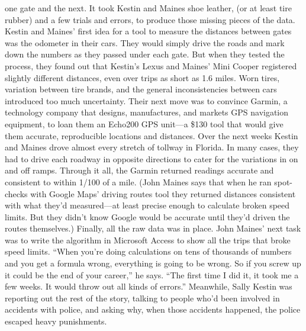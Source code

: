 one gate and the next. It took Kestin and Maines shoe leather, (or at least
tire rubber) and a few trials and errors, to produce those missing pieces of
the data.
Kestin and Maines' first idea for a tool to measure the distances between
gates was the odometer in their cars. They would simply drive the roads
and mark down the numbers as they passed under each gate. But when they
tested the process, they found out that Kestin's Lexus and Maines' Mini
Cooper registered slightly different distances, even over trips as short as 1.6
miles. Worn tires, variation between tire brands, and the general inconsistencies
between cars introduced too much uncertainty.
Their next move was to convince Garmin, a technology company that
designs, manufactures, and markets GPS navigation equipment, to loan
them an Echo200 GPS unit—a \$130 tool that would give them accurate,
reproducible locations and distances. Over the next weeks Kestin and
Maines drove almost every stretch of tollway in Florida. In many cases, they
had to drive each roadway in opposite directions to cater for the variations
in on and off ramps. Through it all, the Garmin returned readings accurate
and consistent to within 1/100 of a mile. (John Maines says that when he ran
spot-checks with Google Maps' driving routes tool they returned distances
consistent with what they'd measured—at least precise enough to calculate
broken speed limits. But they didn't know Google would be accurate until
they'd driven the routes themselves.)
Finally, all the raw data was in place. John Maines' next task was to write the
algorithm in Microsoft Access to show all the trips that broke speed limits.
``When you're doing calculations on tens of thousands of numbers and you
get a formula wrong, everything is going to be wrong. So if you screw up
it could be the end of your career,'' he says. ``The first time I did it, it took
me a few weeks. It would throw out all kinds of errors.'' Meanwhile, Sally
Kestin was reporting out the rest of the story, talking to people who'd been
involved in accidents with police, and asking why, when those accidents
happened, the police escaped heavy punishments.

